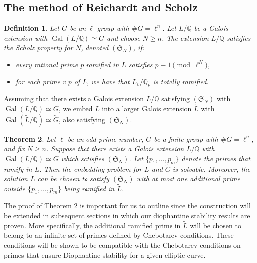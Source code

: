 \documentclass[11pt,reqno]{amsart}
\newtheorem{theorem}{Theorem}[section]
\newtheorem{definition}[theorem]{Definition}
\newcommand{\Q}{\mathbb{Q}}
\newcommand{\op}[1]{\operatorname{#1}}
\numberwithin{equation}{section}
\begin{document}
\subsection{The method of Reichardt and Scholz}
\begin{definition}Let $G$ be an $\ell$-group with $\# G = \ell^n$. Let \( L / \mathbb{Q} \) be a Galois extension with \( \op{Gal}( L/\Q) \simeq G \) and choose \( N \geq n \). The extension $L/\Q$ satisfies the \emph{Scholz property} for \( N \), denoted \( (\mathfrak{S}_N) \), if:
\begin{itemize}
    \item every rational prime \( p \) ramified in $L$ satisfies \( p \equiv 1 \pmod{\ell^N} \),
    \item for each prime \( v|p\) of \( L \), we have that \( L_v / \mathbb{Q}_p \) is totally ramified.
\end{itemize}
\end{definition}
Assuming that there exists a Galois extension $L/\Q$ satisfying $(\mathfrak{S}_N)$ with $\op{Gal}(L/\Q)\simeq G$, we embed $L$ into a larger Galois extension $\widetilde{L}$ with $\op{Gal}(\widetilde{L}/\Q)\simeq \widetilde{G}$, also satisfying $(\mathfrak{S}_N)$.
\begin{theorem}\label{inverse-Gal-thm}
Let $\ell$ be an odd prime number, $G$ be a finite group with $\# G=\ell^n$, and fix $N\geq n$. Suppose that there exists a Galois extension $L/\Q$ with $\op{Gal}(L/\Q)\simeq G$ which satisfies \( (\mathfrak{S}_N) \). Let $\{p_1, \dots, p_m\}$ denote the primes that ramify in $L$. Then the embedding problem for \( L \) and \( \widetilde{G} \) is solvable. Moreover, the solution \( \widetilde{L} \) can be chosen to satisfy \( (\mathfrak{S}_N) \) with at most one additional prime outside $\{p_1, \dots, p_m\}$ being ramified in $\widetilde{L}$.
\end{theorem}
The proof of Theorem \ref{inverse-Gal-thm} is important for us to outline since the construction will be extended in subsequent sections in which our diophantine stability results are proven. More specifically, the additional ramified prime in $\widetilde{L}$ will be chosen to belong to an infinite set of primes defined by Chebotarev conditions. These conditions will be shown to be compatible with the Chebotarev conditions on primes that ensure Diophantine stability for a given elliptic curve. 
\end{document}
